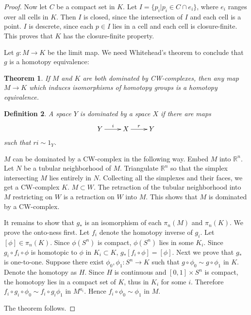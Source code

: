 \documentclass[a4paper,11pt,reqno]{amsart}
\newtheorem{thm}{Theorem}[section]
\newtheorem{defn}[thm]{Definition}
\newcommand{\RR}{\mathbb{R}}      %
\begin{document}
\begin{proof}
  Now let $C$ be a compact set in $K$. Let $I=\{ p_i | p_i \in C \cap
  e_i\}$, where $e_i$ ranges over all cells in $K$. Then $I$ is
  closed, since the intersection of $I$ and each cell is a point. $I$
  is descrete, since each $p \in I$ lies in a cell and each cell is
  closure-finite. This proves that $K$ has the closure-finite
  property.

  Let $g: M \to K$ be the limit map. We need Whitehead's theorem to conclude
  that $g$ is a homotopy equivalence:

  \begin{thm}
    If $M$ and $K$ are both dominated by CW-complexes, then any map $M \to K$
    which induces isomorphisms of homotopy groups is a homotopy equivalence.
  \end{thm}

  \begin{defn}\cite{Hat}
    A space $Y$ is dominated by a space $X$ if there are maps
    \begin{equation}
      \xymatrix{
        Y \ar[r]^i & X \ar[r]^r & Y
      }
    \end{equation}
    such that $ri \sim 1_Y$.
  \end{defn}

  $M$ can be dominated by a CW-complex in the following way. Embed $M$ into
  $\RR^n$. Let $N$ be a tubular neighborhood of $M$. Triangulate $\RR^n$ so that
  the simplex intersecting $M$ lies entirely in $N$. Collecting all the
  simplexes and their faces, we get a CW-complex $K$. $M \subset W$. The
  retraction of the tubular neighborhood into $M$ restricting on $W$ is a
  retraction on $W$ into $M$. This shows that $M$ is dominated by a CW-complex.

  It remains to show that $g_*$ is an isomorphism of each $\pi_n(M)$ and
  $\pi_n(K)$. We prove the onto-ness first. Let $f_i$ denote the homotopy
  inverse of $g_i$. Let $[\phi] \in \pi_n(K)$. Since $\phi(S^n)$ is compact,
  $\phi(S^n)$ lies in some $K_i$. Since $g_i\circ f_i \circ \phi$ is homotopic
  to $\phi$ in $K_i \subset K$, $g_*[f_i\circ\phi] = [\phi]$. Next we prove that
  $g_*$ is one-to-one. Suppose there exist $\phi_0, \phi_1 : S^n \to K$ such
  that $g\circ\phi_0 \sim g\circ\phi_1$ in $K$. Denote the homotopy as
  $H$. Since $H$ is continuous and $[0,1]\times S^n$ is compact, the homotopy
  lies in a compact set of $K$, thus in $K_i$ for some $i$. Therefore $f_i\circ
  g_i\circ\phi_0 \sim f_i\circ g_i\phi_1$ in $M^{a_i}$. Hence $f_i\circ
  \phi_0 \sim \phi_1$ in $M$. 


  The theorem follows.

\end{proof}
\end{document}
